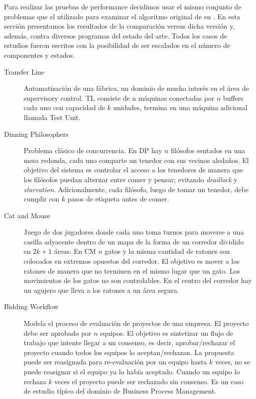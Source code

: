 
Para realizar las pruebas de performance decidimos usar el mismo conjunto de problemas que el utilizado para examinar el algoritmo original de \DCS en \cite{tesisDani}. En esta sección presentamos los resultados de la comparación versus dicha versión y, además, contra diversos programas del estado del arte. Todos los casos de estudios fueron escritos con la posibilidad de ser escalados en el número de componentes y estados.
\begin{description}
    \item [Transfer Line] Automatización de una fábrica, un dominio de mucho interés en el área de supervisory control. TL consiste de n máquinas conectadas por $n$ buffers cada uno con capacidad de $k$ unidades, termina en una máquina adicional llamada Test Unit.
    
    \item [Dinning Philosophers] Problema clásico de concurrencia. En DP hay $n$ filósofos sentados en una mesa redonda, cada uno comparte un tenedor con sus vecinos aledaños. El objetivo del sistema es controlar el acceso a los tenedores de manera que los filósofos puedan alternar entre comer y pensar; evitando \textit{deadlock} y \textit{starvation}. Adicionalmente, cada filósofo, luego de tomar un tenedor, debe cumplir con $k$ pasos de etiqueta antes de comer.

    \item [Cat and Mouse] Juego de dos jugadores donde cada uno toma turnos para moverse a una casilla adyacente dentro de un mapa de la forma de un corredor dividido en $2k + 1$ áreas. En CM $n$ gatos y la misma cantidad de ratones son colocados en extremos opuestos del corredor. El objetivo es mover a los ratones de manera que no terminen en el mismo lugar que un gato. Los movimientos de los gatos no son controlables. En el centro del corredor hay un agujero que lleva a los ratones a un área segura.
    
    \item [Bidding Workflow] Modela el proceso de evaluación de proyectos de una empresa. El proyecto debe ser aprobado por $n$ equipos. El objetivo es sintetizar un flujo de trabajo que intente llegar a un consenso, es decir, aprobar/rechazar el proyecto cuando todos los equipos lo aceptan/rechazan. La propuesta puede ser reasignada para re-evaluación por un equipo hasta $k$ veces, no se puede reasignar si el equipo ya lo había aceptado. Cuando un equipo lo rechaza $k$ veces el proyecto puede ser rechazado sin consenso. Es un caso de estudio típico del dominio de Business Process Management.
    

\end{description}
